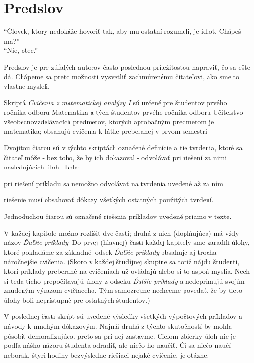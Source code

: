 \chapter*{Predslov}

\setlength\epigraphrule{0pt}
\epigraph{
  \enquote{Človek, ktorý nedokáže hovoriť tak,
  aby mu ostatní rozumeli, je idiot.
  Chápeš ma?} \\
  \enquote{Nie, otec.}
}{}

Predslov je pre zúfalých autorov často poslednou príležitosťou napraviť,
čo sa ešte dá. Chápeme sa preto možnosti vysvetliť zachmúrenému čitateľovi,
ako sme to vlastne mysleli.

Skriptá \emph{Cvičenia z matematickej analýzy I} sú určené pre študentov prvého
ročníka odboru Matematika a tých študentov prvého ročníka odboru Učiteľstvo
všeobecnovzdelávacích predmetov, ktorých aprobačným predmetom je matematika;
obsahujú cvičenia k látke preberanej v prvom semestri.

Dvojitou čiarou sú v týchto skriptách označené definície a tie tvrdenia, ktoré
sa čitateľ môže - bez toho, že by ich dokazoval - odvolávať pri riešení za nimi
nasledujúcich úloh. Teda:
\begin{enumerate*}[label=\alph*)]
  \item pri riešení príkladu sa nemožno odvolávať na tvrdenia uvedené až za ním
  \item riešenie musí obsahovať dôkazy všetkých ostatných použitých tvrdení.
\end{enumerate*}

Jednoduchou čiarou sú označené riešenia príkladov uvedené priamo v texte.

V každej kapitole možno rozlíšiť dve časti; druhá z nich (doplňujúca) má vždy
názov \textit{Ďaľšie príklady}. Do prvej (hlavnej) časti každej kapitoly sme
zaradili úlohy, ktoré pokladáme za základné, odsek \textit{Ďaľšie príklady}
obsahuje aj trocha náročnejšie cvičenia. (Skoro v každej študíjnej skupine sa
totiž nájdu študenti, ktorí príklady preberané na cvičeniach už ovládajú alebo
si to aspoň myslia. Nech si teda ticho prepočítavajú úlohy z odseku
\textit{Ďaľšie príklady} a nedeprimujú svojím znudeným výrazom cvičiaceho. Tým
samozrejme nechceme povedať, že by tieto úlohy boli neprístupné pre ostatných
študentov.)

V poslednej časti skrípt sú uvedené výsledky všetkých výpočtových príkladov a
návody k mnohým dôkazovým. Najmä druhá z týchto skutočností by mohla pôsobiť
demoralizujúco, preto sa pri nej zastavme. Cieľom zbierky úloh nie je podľa
nášho názoru študenta odradiť, ale niečo ho naučiť. Či sa niečo naučí neborák,
štyri hodiny bezvýsledne riešiaci nejaké cvičenie, je otázne.

